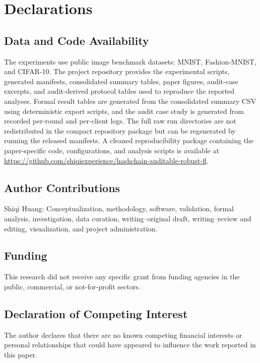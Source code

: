 \documentclass[preprint,12pt]{elsarticle}
\begin{document}
\section{Declarations}

\subsection{Data and Code Availability}

The experiments use public image benchmark datasets: MNIST, Fashion-MNIST, and CIFAR-10. The project repository provides the experimental scripts, generated manifests, consolidated summary tables, paper figures, audit-case excerpts, and audit-derived protocol tables used to reproduce the reported analyses. Formal result tables are generated from the consolidated summary CSV using deterministic export scripts, and the audit case study is generated from recorded per-round and per-client logs. The full raw run directories are not redistributed in the compact repository package but can be regenerated by running the released manifests. A cleaned reproducibility package containing the paper-specific code, configurations, and analysis scripts is available at \url{https://github.com/shiqiexperience/hashchain-auditable-robust-fl}.

\subsection{Author Contributions}

Shiqi Huang: Conceptualization, methodology, software, validation, formal analysis, investigation, data curation, writing--original draft, writing--review and editing, visualization, and project administration.

\subsection{Funding}

This research did not receive any specific grant from funding agencies in the public, commercial, or not-for-profit sectors.

\subsection{Declaration of Competing Interest}

The author declares that there are no known competing financial interests or personal relationships that could have appeared to influence the work reported in this paper.
\end{document}
